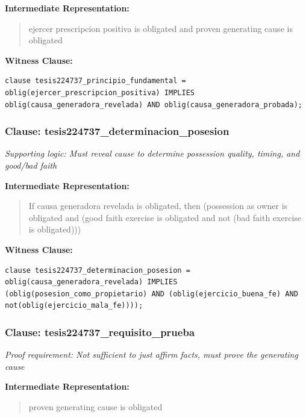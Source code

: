 \documentclass[11pt,a4paper]{article}
\begin{document}
\textbf{Intermediate Representation:}

\begin{quote}
ejercer prescripcion positiva is obligated and proven generating cause is obligated
\end{quote}

\textbf{Witness Clause:}

\begin{lstlisting}[style=witnessstyle, language=Witness]
clause tesis224737_principio_fundamental = oblig(ejercer_prescripcion_positiva) IMPLIES oblig(causa_generadora_revelada) AND oblig(causa_generadora_probada);
\end{lstlisting}

\subsubsection{Clause: tesis224737\_determinacion\_posesion}

\textit{Supporting logic: Must reveal cause to determine possession quality, timing, and good/bad faith}

\textbf{Intermediate Representation:}

\begin{quote}
If causa generadora revelada is obligated, then (possession as owner is obligated and (good faith exercise is obligated and not (bad faith exercise is obligated)))
\end{quote}

\textbf{Witness Clause:}

\begin{lstlisting}[style=witnessstyle, language=Witness]
clause tesis224737_determinacion_posesion = oblig(causa_generadora_revelada) IMPLIES (oblig(posesion_como_propietario) AND (oblig(ejercicio_buena_fe) AND not(oblig(ejercicio_mala_fe))));
\end{lstlisting}

\subsubsection{Clause: tesis224737\_requisito\_prueba}

\textit{Proof requirement: Not sufficient to just affirm facts, must prove the generating cause}

\textbf{Intermediate Representation:}

\begin{quote}
proven generating cause is obligated
\end{quote}
\end{document}
